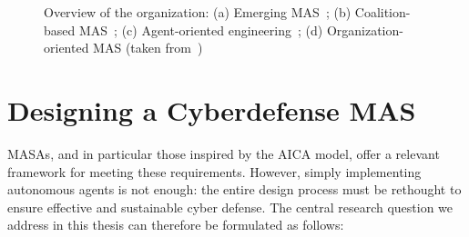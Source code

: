 \begin{figure}[h]
  \centering
  \resizebox{\textwidth}{!}{%
    
  }
  \caption[Overview of the organization (from~\cite{Picard2009reorganization})]{Overview of the organization: (a) Emerging MAS~; (b) Coalition-based MAS~; (c) Agent-oriented engineering~; (d) Organization-oriented MAS (taken from~\cite{Picard2009reorganisation})}
  \label{fig:auto_vs_topdown}
\end{figure}





\section{Designing a Cyberdefense MAS}\label{sec:problematique-sma}

MASAs, and in particular those inspired by the AICA model, offer a relevant framework for meeting these requirements. However, simply implementing autonomous agents is not enough: the entire design process must be rethought to ensure effective and sustainable cyber defense.
The central research question we address in this thesis can therefore be formulated as follows:

